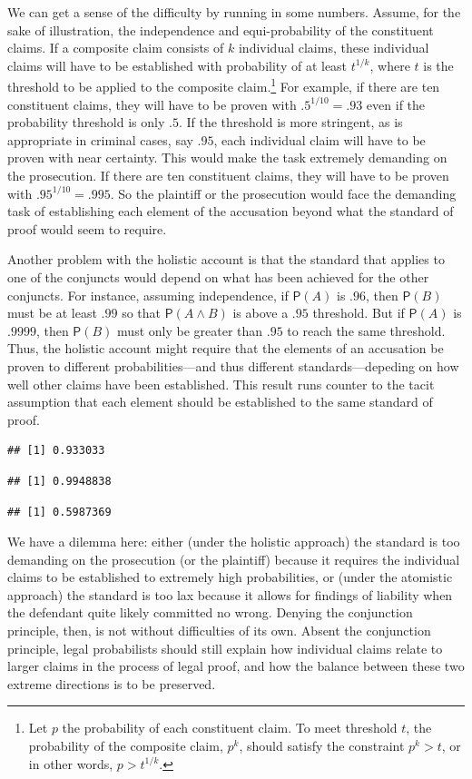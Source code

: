 \documentclass[
  10pt,
  dvipsnames,enabledeprecatedfontcommands]{scrartcl}
\newcommand{\et}{\wedge}
\newcommand{\pr}[1]{\mathsf{P}(#1)}
\begin{document}
We can get a sense of the difficulty by running in some numbers. Assume,
for the sake of illustration, the independence and equi-probability of
the constituent claims. If a composite claim consists of \(k\)
individual claims, these individual claims will have to be established
with probability of at least \(t^{1/k}\), where \(t\) is the threshold
to be applied to the composite
claim.\footnote{Let $p$ the probability of each constituent claim. To meet threshold $t$, the probability of the composite claim, $p^k$, should satisfy the constraint $p^k>t$, or in other words, $p>t^{1/k}$.}
For example, if there are ten constituent claims, they will have to be
proven with \(.5^{1/10}=.93\) even if the probability threshold is only
\(.5\). If the threshold is more stringent, as is appropriate in
criminal cases, say \(.95\), each individual claim will have to be
proven with near certainty. This would make the task extremely demanding
on the prosecution. If there are ten constituent claims, they will have
to be proven with \(.95^{1/10}=.995\). So the plaintiff or the
prosecution would face the demanding task of establishing each element
of the accusation beyond what the standard of proof would seem to
require.

Another problem with the holistic account is that the standard that
applies to one of the conjuncts would depend on what has been achieved
for the other conjuncts. For instance, assuming independence, if
\(\pr{A}\) is \(.96\), then \(\pr{B}\) must be at least \(.99\) so that
\(\pr{A\et B}\) is above a \(.95\) threshold. But if \(\pr{A}\) is
\(.9999\), then \(\pr{B}\) must only be greater than \(.95\) to reach
the same threshold. Thus, the holistic account might require that the
elements of an accusation be proven to different probabilities---and
thus different standards---depeding on how well other claims have been
established. This result runs counter to the tacit assumption that each
element should be established to the same standard of proof.

\begin{verbatim}
## [1] 0.933033
\end{verbatim}

\begin{verbatim}
## [1] 0.9948838
\end{verbatim}

\begin{verbatim}
## [1] 0.5987369
\end{verbatim}

We have a dilemma here: either (under the holistic approach) the
standard is too demanding on the prosecution (or the plaintiff) because
it requires the individual claims to be established to extremely high
probabilities, or (under the atomistic approach) the standard is too lax
because it allows for findings of liability when the defendant quite
likely committed no wrong. Denying the conjunction principle, then, is
not without difficulties of its own. Absent the conjunction principle,
legal probabilists should still explain how individual claims relate to
larger claims in the process of legal proof, and how the balance between
these two extreme directions is to be preserved.
\end{document}
